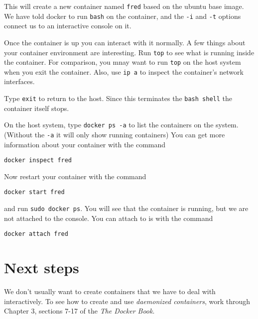 \documentclass{article}
\begin{document}
This will create a new container named \texttt{fred} based on the ubuntu base image. We have told docker to run \texttt{bash} on the container, and the \texttt{-i} and \texttt{-t} options connect us to an interactive console on it.  

Once the container is up you can interact with it normally.  A few things about your container environment are interesting. Run \texttt{top} to see what is running inside the container.  For comparison, you mnay want to run \texttt{top} on the host system when you exit the container.  Also, use \texttt{ip a} to inspect the container's network interfaces.

Type \texttt{exit} to return to the host. Since this terminates the \texttt{bash shell} the container itself stops.

On the host system, type \texttt{docker ps -a} to list the containers on the system. (Without the \texttt{-a} it will only show running containers) You can get more information about your container with the command

\texttt{docker inspect fred}

Now restart your container with the command 

\texttt{docker start fred}

and run \texttt{sudo docker ps}.  You will see that the container is running, but we are not attached to the console.  You can attach to is with the command

\texttt{docker attach fred}

\section{Next steps}
We don't usually want to create containers that we have to deal with interactively.  To see how to create and use \emph{daemonized containers}, work through  Chapter 3, sections 7-17 of the \emph{The Docker Book}.
\end{document}
